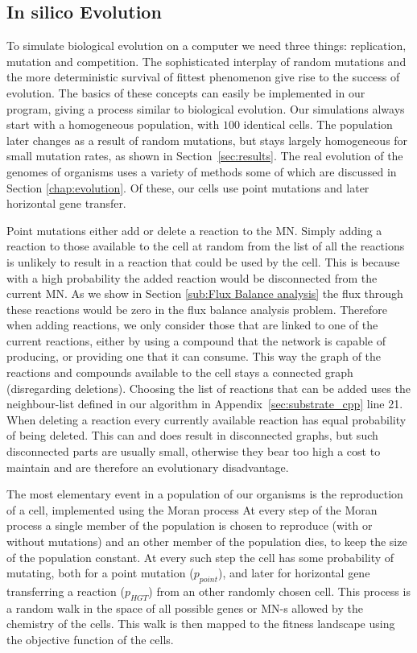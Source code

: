 \documentclass[a4paper,12pt]{article}
\begin{document}
\subsection{In silico Evolution}
\label{sub:implementing evolution}
To simulate biological evolution on a computer we need three things: replication, mutation and competition. The sophisticated interplay of random mutations and the more deterministic survival of fittest phenomenon give rise to the success of evolution. The basics of these concepts can easily be implemented in our program, giving a process similar to biological evolution. Our simulations always start with a homogeneous population, with $100$ identical cells. The population later changes as a result of random mutations, but stays largely homogeneous for small mutation rates, as shown in Section~\ref{sec:results}. The real evolution of the genomes of organisms uses a variety of methods some of which are discussed in Section \ref{chap:evolution}. Of these, our cells use point mutations and later horizontal gene transfer.
	
	Point mutations either add or delete a reaction to the MN. Simply adding a reaction to those available to the cell at random from the list of all the reactions is unlikely to result in a reaction that could be used by the cell. This is because with a high probability the added reaction would be disconnected from the current MN. As we show in Section \ref{sub:Flux Balance analysis} the flux through these reactions would be zero in the flux balance analysis problem. Therefore when adding reactions, we only consider those that are linked to one of the current reactions, either by using a compound that the network is capable of producing, or providing one that it can consume. %
	This way the graph of the reactions and compounds available to the cell stays a connected graph (disregarding deletions). Choosing the list of reactions that can be added uses the neighbour-list defined in our algorithm in Appendix~\ref{sec:substrate_cpp} line 21. When deleting a reaction every currently available reaction has equal probability of being deleted. This can and does result in disconnected graphs, but such disconnected parts are usually small, otherwise they bear too high a cost to maintain and are therefore an evolutionary disadvantage.
	
The most elementary event in a population of our organisms is the reproduction of a cell, implemented using the Moran process \cite{moranprocess} 
At every step of the Moran process a single member of the population is chosen to reproduce (with or without mutations) and an other member of the population dies, to keep the size of the population constant. At every such step the cell has some probability of mutating, both for a point mutation ($p_{point}$), and later for horizontal gene transferring a reaction ($p_{HGT}$) from an other randomly chosen cell. This process is a random walk in the space of all possible genes or MN-s allowed by the chemistry of the cells. This walk is then mapped to the fitness landscape using the objective function of the cells.
\end{document}
